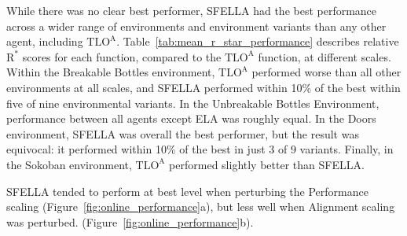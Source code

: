 While there was no clear best performer, SFELLA had the best performance across a wider range of environments and environment variants than any other agent, including  $\text{TLO}^\text{A}$. Table~\ref{tab:mean_r_star_performance} describes relative $\text{R}^*$ scores for each function, compared to the $\text{TLO}^\text{A}$ function, at different scales.  Within the Breakable Bottles environment, $\text{TLO}^\text{A}$ performed worse than all other environments at all scales, and SFELLA performed within 10\% of the best within five of nine environmental variants. In the Unbreakable Bottles Environment, performance between all agents except ELA was roughly equal. In the Doors environment, SFELLA was overall the best performer, but the result was equivocal: it performed within 10\% of the best in just 3 of 9 variants. Finally, in the Sokoban environment, $\text{TLO}^\text{A}$ performed slightly better than SFELLA.

SFELLA tended to perform at best level when perturbing the Performance scaling (Figure~\ref{fig:online_performance}a), but less well when Alignment scaling was perturbed. (Figure~\ref{fig:online_performance}b).